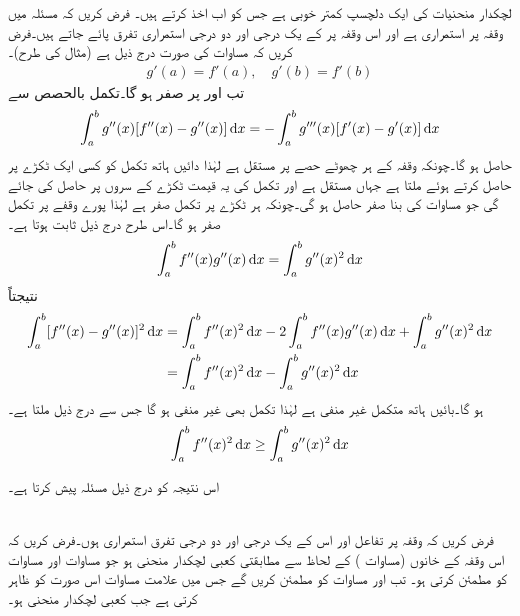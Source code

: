 لچکدار منحنیات کی ایک دلچسپ کمتر خوبی ہے جس کو اب اخذ کرتے ہیں۔ فرض کریں کہ مسئلہ  میں وقفہ  پر  استمراری ہے اور اس وقفہ پر  کے یک درجی اور  دو درجی استمراری تفرق پائے جاتے ہیں۔فرض کریں کہ مساوات  کی صورت درج ذیل ہے (مثال  کی طرح)۔
\begin{align}\label{مساوات_اعدادی_کمتر_خوبی_الف}
g'(a)=f'(a),\quad g'(b)=f'(b)
\end{align} 
تب  اور  پر  صفر ہو گا۔تکمل بالحصص سے
\begin{align*}
\int_a^b g''(x)[f''(x)-g''(x)]\dif x=-\int_a^b g'''(x)[f'(x)-g'(x)]\dif x
\end{align*}
حاصل ہو گا۔چونکہ وقفہ کے ہر چھوٹے حصے پر  مستقل ہے لہٰذا دائیں ہاتھ تکمل کو کسی ایک ٹکڑے پر حاصل کرتے ہوئے    ملتا ہے جہاں  مستقل ہے اور تکمل کی یہ قیمت ٹکڑے کے سروں پر حاصل کی جائے گی جو مساوات  کی بنا صفر حاصل ہو گی۔چونکہ ہر ٹکڑے پر تکمل صفر ہے لہٰذا پورے وقفے پر تکمل صفر ہو گا۔اس طرح درج ذیل ثابت ہوتا ہے۔
\begin{align*}
\int_a^b f''(x)g''(x)\dif x=\int_a^b g''(x)^2\dif x
\end{align*}
نتیجتاً
\begin{align*}
\int_a^b[f''(x)-g''(x)]^2\dif x&=\int_a^b f''(x)^2\dif x-2\int_a^b f''(x)g''(x)\dif x+\int_a^b g''(x)^2\dif x\\
&=\int_a^b f''(x)^2\dif x-\int_a^b g''(x)^2\dif x
\end{align*}
ہو گا۔بائیں ہاتھ متکمل غیر منفی ہے لہٰذا تکمل بھی غیر منفی ہو گا جس سے درج ذیل ملتا ہے۔
\begin{align}\label{مساوات_اعدادی_کمتر_خوبی_ب}
\int_a^b f''(x)^2\dif x\ge \int_a^b g''(x)^2\dif x
\end{align}

اس نتیجہ کو درج ذیل مسئلہ پیش کرتا ہے۔

\quad {}\\
فرض کریں کہ وقفہ  پر تفاعل  اور اس کے یک درجی اور دو درجی تفرق استمراری ہوں۔فرض کریں کہ اس وقفہ کے  خانوں  (مساوات ) کے لحاظ سے   مطابقتی کعبی لچکدار منحنی ہو جو  مساوات  اور مساوات  کو مطمئن کرتی ہو۔ تب  اور  مساوات  کو مطمئن کریں گے جس میں  علامت مساوات  اس صورت کو ظاہر کرتی ہے جب  کعبی لچکدار منحنی  ہو۔

